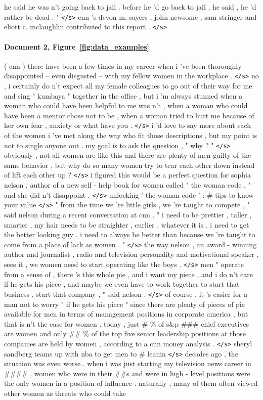 \documentclass[12pt]{report}
\begin{document}
\begin{appendices}
he said he was n't going back to jail . before he 'd go back to jail , he said , he 'd rather be dead . " \texttt{</s>} cnn 's devon m. sayers , john newsome , sam stringer and eliott c. mclaughlin contributed to this report . \texttt{</s>}

\paragraph{Document 2, Figure~\ref{fig:data_examples}}  ( cnn ) there have been a few times in my career when i 've been thoroughly disappointed -- even disgusted -- with my fellow women in the workplace . \texttt{</s>} no , i certainly do n't expect all my female colleagues to go out of their way for me and sing " kumbaya " together in the office , but i 'm always stunned when a woman who could have been helpful to me was n't , when a woman who could have been a mentor chose not to be , when a woman tried to hurt me because of her own fear , anxiety or what have you . \texttt{</s>} i 'd love to say more about each of the women i 've met along the way who fit those descriptions , but my point is not to single anyone out . my goal is to ask the question , " why ? " \texttt{</s>} obviously , not all women are like this and there are plenty of men guilty of the same behavior , but why do so many women try to tear each other down instead of lift each other up ? \texttt{</s>} i figured this would be a perfect question for sophia nelson , author of a new self - help book for women called " the woman code , " and she did n't disappoint . \texttt{</s>} unlocking ' the woman code ' : \# tips to know your value \texttt{</s>} " from the time we 're little girls , we 're taught to compete , " said nelson during a recent conversation at cnn . " i need to be prettier , taller , smarter , my hair needs to be straighter , curlier , whatever it is . i need to get the better looking guy . i need to always be better than because we 're taught to come from a place of lack as women . " \texttt{</s>} the way nelson , an award - winning author and journalist , radio and television personality and motivational speaker , sees it , we women need to start operating like the boys . \texttt{</s>} men " operate from a sense of , there 's this whole pie , and i want my piece , and i do n't care if he gets his piece , and maybe we even have to work together to start that business , start that company , " said nelson . \texttt{</s>} of course , it 's easier for a man not to worry " if he gets his piece " since there are plenty of pieces of pie available for men in terms of management positions in corporate america , but that is n't the case for women . today , just \# \% of s\&p \#\#\# chief executives are women and only \#\# \% of the top five senior leadership positions at those companies are held by women , according to a cnn money analysis . \texttt{</s>} sheryl sandberg teams up with nba to get men to \# leanin \texttt{</s>} decades ago , the situation was even worse . when i was just starting my television news career in \#\#\#\# , women who were in their \#\#s and were in high - level positions were the only women in a position of influence . naturally , many of them often viewed other women as threats who could take 
\end{appendices}
\end{document}
